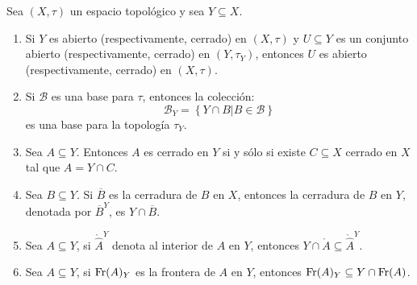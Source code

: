 \documentclass[12pt]{report}
\theoremstyle{largebreak}
\newcommand{\Int}[1]{\ensuremath{\mathring{#1}}}
\newcommand{\Cls}[1]{\ensuremath{\overline{#1}}}
\newcommand{\Fr}[1]{\ensuremath{\textup{Fr}(#1)}}
\begin{document}
    \begin{propo}
        Sea $(X,\tau)$ un espacio topológico y sea $Y\subseteq X$.
        \begin{enumerate}
            \item Si $Y$ es abierto (respectivamente, cerrado) en $(X,\tau)$ y $U\subseteq Y$ es un conjunto abierto (respectivamente, cerrado) en $(Y,\tau_Y)$, entonces $U$ es abierto (respectivamente, cerrado) en $(X,\tau)$.
            \item Si $\mathcal{B}$ es una base para $\tau$, entonces la colección:
            \begin{equation*}
                \mathcal{B}_Y=\left\{Y\cap B\Big| B\in\mathcal{B} \right\}
            \end{equation*}
            es una base para la topología $\tau_Y$.
            \item Sea $A\subseteq Y$. Entonces $A$ es cerrado en $Y$ si y sólo si existe $C\subseteq X$ cerrado en $X$ tal que $A=Y\cap C$.
            \item Sea $B\subseteq Y$. Si $\Cls{B}$ es la cerradura de $B$ en $X$, entonces la cerradura de $B$ en $Y$, denotada por $\Cls{B}^Y$, es $Y\cap \Cls{B}$.
            \item Sea $A\subseteq Y$, si $\Int{\widehat{A}}^Y$ denota al interior de $A$ en $Y$, entonces $Y\cap\Int{A}\subseteq \Int{\widehat{A}}^Y$.
            \item Sea $A\subseteq Y$, si $\Fr{A}_Y$ es la frontera de $A$ en $Y$, entonces $\Fr{A}_Y\subseteq Y\cap \Fr{A}$.
        \end{enumerate}
    \end{propo}
\end{document}
